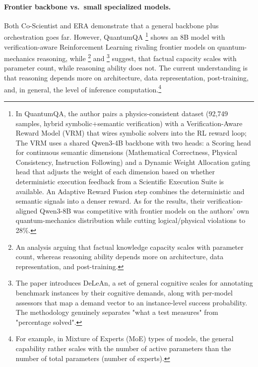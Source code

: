 \paragraph{Frontier backbone vs.\ small specialized models.} Both Co-Scientist \cite{Gottweis2026} and ERA \cite{Aygn2026} demonstrate that a general backbone plus orchestration goes far. However, QuantumQA \cite{2604.18176}\footnote{%
    In QuantumQA, the author pairs a physics-consistent dataset (92{,}749 samples, hybrid symbolic+semantic verification) with a Verification-Aware Reward Model (VRM) that wires symbolic solvers into the RL reward loop; 
    The VRM uses a shared Qwen3-4B backbone with two heads: a Scoring head for continuous semantic dimensions (Mathematical Correctness, Physical Consistency, Instruction Following) and a Dynamic Weight Allocation gating head that adjusts the weight of each dimension based on whether deterministic execution feedback from a Scientific Execution Suite is available. An Adaptive Reward Fusion step combines the deterministic and semantic signals into a denser reward.
    As for the results, their verification-aligned Qwen3-8B was competitive with frontier models on the authors' own quantum-mechanics distribution while cutting logical/physical violations to 28\%.
    }
shows an 8B model with verification-aware Reinforcement Learning rivaling frontier models on quantum-mechanics reasoning, while \cite{lesswrong2026incompressible}\footnote{
    An analysis arguing that factual knowledge capacity scales with parameter count, whereas reasoning ability depends more on architecture, data representation, and post-training.
    }
and \cite{Zhou2026}\footnote{%
    The paper introduces DeLeAn, a set of general cognitive scales for annotating benchmark instances by their cognitive demands, along with per-model assessors that map a demand vector to an instance-level success probability.
    The methodology genuinely separates "what a test measures" from "percentage solved".
    }
suggest, that factual capacity scales with parameter count, while reasoning ability does not. The current understanding is that reasoning depends more on architecture, data representation, post-training, and, in general, the level of inference computation.\footnote{
    For example, in Mixture of Experts (MoE) types of models, the general capability rather scales with the number of active parameters than the number of total parameters (number of experts).
}

